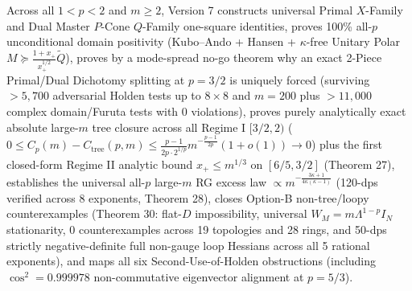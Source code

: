\documentclass[11pt,a4paper]{article}
\begin{document}
Across all \(1 < p < 2\) and \(m \ge 2\), Version 7 constructs universal
Primal \(X\)-Family and Dual Master \(P\)-Cone \(Q\)-Family one-square
identities, proves 100\% all-\(p\) unconditional domain positivity
(Kubo--Ando + Hansen + \(\kappa\)-free Unitary Polar
\(M \succeq \frac{1+x_+}{x_+^{1/2}}\widetilde{Q}\)), proves by a
mode-spread no-go theorem why an exact 2-Piece Primal/Dual Dichotomy
splitting at \(p = 3/2\) is uniquely forced (surviving \(> 5{,}700\)
adversarial Holden tests up to \(8\times 8\) and \(m = 200\) plus
\(> 11{,}000\) complex domain/Furuta tests with 0 violations), proves
purely analytically exact absolute large-\(m\) tree closure across all
Regime I \([3/2, 2)\)
(\(0 \le C_p(m) - C_{\mathrm{tree}}(p, m) \le \frac{p-1}{2p\cdot 2^{1/p}} m^{-\frac{p-1}{2p}}(1+o(1)) \to 0\))
plus the first closed-form Regime II analytic bound \(x_+ \le m^{1/3}\)
on \([6/5, 3/2]\) (Theorem 27), establishes the universal all-\(p\)
large-\(m\) RG excess law
\(\propto m^{-\frac{3\kappa+1}{4\kappa(\kappa-1)}}\) (120-dps verified
across 8 exponents, Theorem 28), closes Option-B non-tree/loopy
counterexamples (Theorem 30: flat-\(D\) impossibility, universal
\(W_M = m\Lambda^{1-p} I_N\) stationarity, 0 counterexamples across 19
topologies and 28 rings, and 50-dps strictly negative-definite full
non-gauge loop Hessians across all 5 rational exponents), and maps all
six Second-Use-of-Holden obstructions (including
\(\cos^2 = 0.999978\) non-commutative eigenvector alignment at
\(p = 5/3\)).
\end{document}
